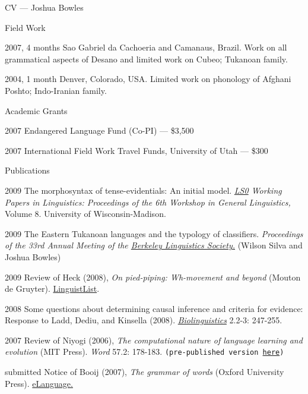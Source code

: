 \begin{cv}{CV --- Joshua Bowles}
\begin{cvlist}{Field Work}
\item[2007, 4 months] Sao Gabriel da Cachoeria and Camanaus, Brazil. Work on all grammatical
aspects of Desano and limited work on Cubeo; Tukanoan family. 
\item[2004, 1 month] Denver, Colorado, USA. Limited work on phonology of Afghani Poshto;
Indo-Iranian family.
\end{cvlist}

\begin{cvlist}{Academic Grants}
\item[2007] Endangered Language Fund (Co-PI) --- \$3,500  
\item[2007] International Field Work Travel Funds, University of Utah --- \$300
\end{cvlist}

\begin{cvlist}{Publications}
\item[2009] The morphosyntax of tense-evidentials: An initial model.
\emph{\href{http://vanhise.lss.wisc.edu/ling/?q=node/21}{LS0} Working Papers in Linguistics: Proceedings
of the 6th Workshop in General Linguistics,} Volume 8. University of Wisconsin-Madison.

\item[2009] The Eastern Tukanoan languages and the typology of classifiers. \emph{Proceedings of the 33rd
Annual Meeting of the \href{http://linguistics.berkeley.edu/BLS/past_meetings.html}{Berkeley
Linguistics Society.}} (Wilson Silva and Joshua Bowles)

\item[2009] Review of Heck (2008), \emph{On pied-piping: Wh-movement and beyond} (Mouton de
Gruyter). \href{http://linguistlist.org/issues/20/20-2283.html}{LinguistList}.

\item[2008] Some questions about determining causal inference and criteria for evidence:
Response to Ladd, Dediu, and Kinsella (2008).
\emph{\href{http://www.biolinguistics.eu.}{Biolinguistics}} 2.2-3: 247-255.

\item[2007] Review of Niyogi (2006), \emph{The computational nature of language learning and
evolution} (MIT Press). {\it Word} 57.2: 178-183. \texttt{(pre-published version
\href{http://sites.google.com/site/bowleslinguistics/Home/research/teaching-1/publications}{here})}

\item[submitted] Notice of Booij (2007), \emph{The grammar of words} (Oxford University Press).
\href{http://www.elanguage.net/home.php}{eLanguage.}


\end{cvlist}
\end{cv}
